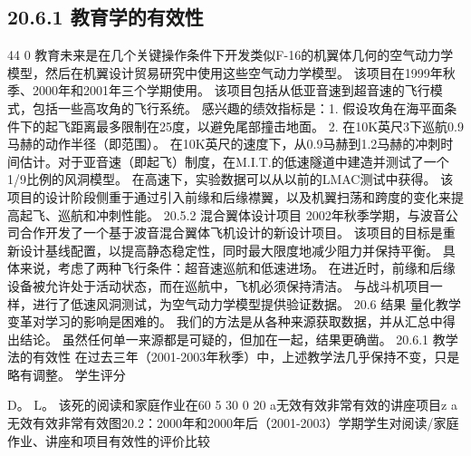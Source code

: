 \documentclass[UTF8,11pt,a4paper,openany,fontset=fandol]{ctexbook}
\begin{document}
\subsection{20.6.1 教育学的有效性}
44 0 教育未来是在几个关键操作条件下开发类似F-16的机翼体几何的空气动力学模型，然后在机翼设计贸易研究中使用这些空气动力学模型。 该项目在1999年秋季、2000年和2001年三个学期使用。 该项目包括从低亚音速到超音速的飞行模式，包括一些高攻角的飞行系统。 感兴趣的绩效指标是：1. 假设攻角在海平面条件下的起飞距离最多限制在25度，以避免尾部撞击地面。 2. 在10K英尺3下巡航0.9马赫的动作半径（即范围）。 在10K英尺的速度下，从0.9马赫到1.2马赫的冲刺时间估计。对于亚音速（即起飞）制度，在M.I.T.的低速隧道中建造并测试了一个1/9比例的风洞模型。 在高速下，实验数据可以从以前的LMAC测试中获得。 该项目的设计阶段侧重于通过引入前缘和后缘襟翼，以及机翼扫荡和跨度的变化来提高起飞、巡航和冲刺性能。 20.5.2 混合翼体设计项目 2002年秋季学期，与波音公司合作开发了一个基于波音混合翼体飞机设计的新设计项目。 该项目的目标是重新设计基线配置，以提高静态稳定性，同时最大限度地减少阻力并保持平衡。 具体来说，考虑了两种飞行条件：超音速巡航和低速进场。 在进近时，前缘和后缘设备被允许处于活动状态，而在巡航中，飞机必须保持清洁。 与战斗机项目一样，进行了低速风洞测试，为空气动力学模型提供验证数据。 20.6 结果 量化教学变革对学习的影响是困难的。 我们的方法是从各种来源获取数据，并从汇总中得出结论。 虽然任何单一来源都是可疑的，但加在一起，结果更确凿。 20.6.1 教学法的有效性 在过去三年（2001-2003年秋季）中，上述教学法几乎保持不变，只是略有调整。 学生评分

D。 L。 该死的阅读和家庭作业在60 5 30 0 20 a无效有效非常有效的讲座项目z a无效有效非常有效图20.2：2000年和2000年后（2001-2003）学期学生对阅读/家庭作业、讲座和项目有效性的评价比较
\end{document}
